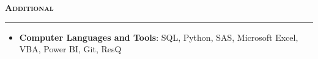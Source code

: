 \documentclass[11pt,letterpaper]{article}
\newcommand{\sectline}{\vspace{5pt}\hrule height 1.5pt\vspace{5pt}}
\newcommand{\sectspace}{\vspace{9pt}}
\newcommand{\smallspace}{\vspace{6pt}}
\newcommand{\heading}[1]{{\fontsize{14pt}{13pt} {\textbf{\textsc{#1}}}}}
\begin{document}


\heading{Additional}\sectline
\begin{itemize}
	\item \textbf{Computer Languages and Tools}: SQL, Python, SAS, Microsoft Excel, VBA, Power BI, Git, ResQ
\end{itemize}
\end{document}
